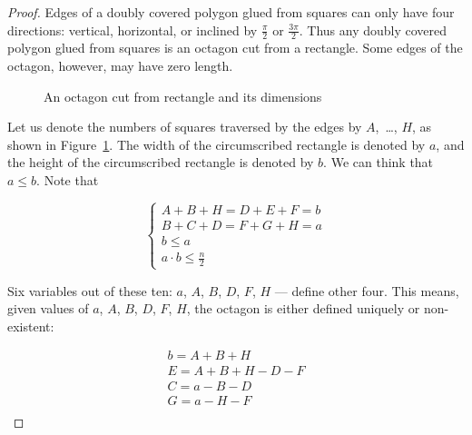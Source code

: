 \documentclass[a4paper,11pt]{article}
\begin{document}
\begin{proof} Edges of a doubly covered polygon glued from squares can only have four directions: vertical, horizontal, or inclined by $\frac{\pi}{2}$ or $\frac{3\pi}{2}$. Thus any doubly covered polygon glued from squares is an octagon cut from a rectangle. Some edges of the octagon, however, may have zero length.

\begin{figure}[h] \centering {}
	\caption{An octagon cut from rectangle and its dimensions}
	\label{fig:octparam}
\end{figure}

Let us denote the numbers of squares traversed by the edges by $A$,~\ldots, $H$, as shown in Figure~\ref{fig:octparam}. The width of the circumscribed rectangle is denoted by $a$, and the height of the circumscribed rectangle is denoted by $b$. We can think that $a \le b$. Note that

\[ \begin{cases}
	A+B+H = D+E+F = b \\
	B+C+D = F+G+H = a \\
	b \le a\\ a \cdot b \le \frac{n}{2}
\end{cases} \]

Six variables out of these ten: $a$, $A$, $B$, $D$, $F$, $H$ — define other four. This means, given values of $a$, $A$, $B$, $D$, $F$, $H$, the octagon is either defined uniquely or non-existent:

\[ \begin{array}{l}
	b = A+B+H \\
	E = A+B+H-D-F \\
	C = a-B-D \\
	G = a-H-F \\
\end{array} \]


\end{proof}
\end{document}
